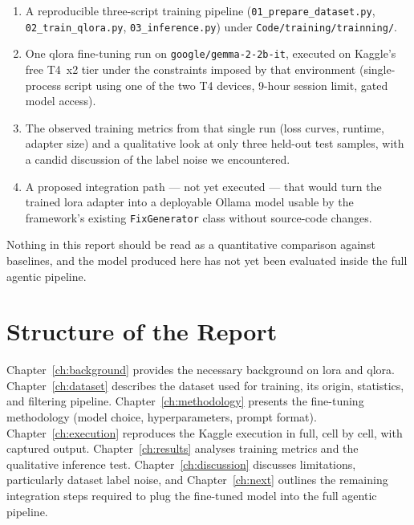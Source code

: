 \documentclass[12pt, a4paper]{report}
\begin{document}
\begin{enumerate}
  \item A reproducible three-script training pipeline
        (\texttt{01\_prepare\_dataset.py}, \texttt{02\_train\_qlora.py},
         \texttt{03\_inference.py}) under
         \texttt{Code/training/trainning/}.
  \item One \gls{qlora} fine-tuning run on
        \texttt{google/gemma-2-2b-it}, executed on Kaggle's free
        T4~x2 tier under the constraints imposed by that environment
        (single-process script using one of the two T4 devices,
        9-hour session limit, gated model access).
  \item The observed training metrics from that single run (loss curves,
        runtime, adapter size) and a qualitative look at only three
        held-out test samples, with a candid discussion of the label
        noise we encountered.
  \item A proposed integration path --- not yet executed --- that would
        turn the trained \gls{lora} adapter into a deployable Ollama
        model usable by the framework's existing \texttt{FixGenerator}
        class without source-code changes.
\end{enumerate}

Nothing in this report should be read as a quantitative comparison
against baselines, and the model produced here has not yet been
evaluated inside the full agentic pipeline.

\section{Structure of the Report}

Chapter~\ref{ch:background} provides the necessary background on \gls{lora}
and \gls{qlora}. Chapter~\ref{ch:dataset} describes the dataset used for
training, its origin, statistics, and filtering pipeline.
Chapter~\ref{ch:methodology} presents the fine-tuning methodology
(model choice, hyperparameters, prompt format).
Chapter~\ref{ch:execution} reproduces the Kaggle execution in full,
cell by cell, with captured output.
Chapter~\ref{ch:results} analyses training metrics and the qualitative
inference test.
Chapter~\ref{ch:discussion} discusses limitations, particularly dataset
label noise, and Chapter~\ref{ch:next} outlines the remaining integration
steps required to plug the fine-tuned model into the full agentic pipeline.

\end{document}
